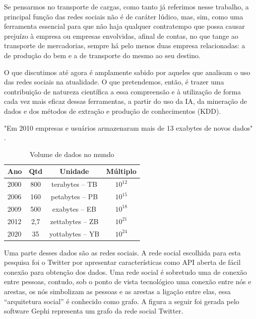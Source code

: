 Se pensarmos no transporte de cargas, como tanto já referimos nesse trabalho, a principal função das redes sociais não é de caráter lúdico, mas, sim, como uma ferramenta essencial para que não haja qualquer contratempo que possa causar prejuízo à empresa ou empresas envolvidas, afinal de contas, no que tange ao transporte de mercadorias, sempre há pelo menos duas empresa relacionadas: a de produção do bem e a de transporte do mesmo ao seu destino.

O que discutimos até agora é amplamente sabido por aqueles que analisam o uso das redes sociais na atualidade. O que pretendemos, então, é trazer uma contribuição de natureza científica a essa compreensão e à utilização de forma cada vez mais eficaz dessas ferramentas, a partir do uso da IA, da mineração de dados e dos métodos de extração e produção de conhecimentos (KDD).


"Em 2010 empresas e usuários armazenaram mais de 13 exabytes de novos dados" \cite{bigdataQualquerUm}.

\begin{table}[!ht]
	\centering
	\caption{Volume de dados no mundo}
	\vspace{1mm}
	\begin{tabular}{l|c|c|c}
		\hline
		\textbf{Ano} & \textbf{Qtd} & \textbf{Unidade} & \textbf{Múltiplo}\\
		\hline
		2000 & 800 & terabytes – TB & $10^{12}$\\
		2006 & 160 & petabytes – PB & $10^{15}$\\
		2009 & 500 & exabytes – EB & $10^{18}$ \\
		2012 & 2,7 & zettabytes – ZB & $10^{21}$\\
		2020 & 35 & yottabytes – YB & $10^{24}$\\
	\end{tabular}
\end{table}

Uma parte desses dados são as redes sociais. A rede social escolhida para esta pesquisa foi o Twitter por apresentar características como API aberta de fácil conexão para obtenção dos dados. Uma rede social é sobretudo uma de conexão entre pessoas, contudo, sob o ponto de vista tecnológico uma conexão entre nós e arestas, os nós simbolizam as pessoas e as arestas a ligação entre elas, essa ``arquitetura social'' é conhecido como grafo. A figura a seguir foi gerada pelo software Gephi \cite{ICWSM09154} representa um grafo da rede social Twitter.

